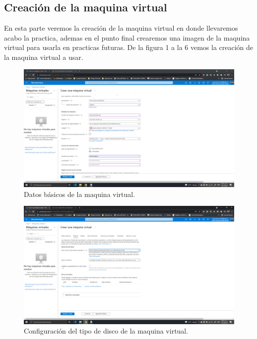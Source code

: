 \documentclass[11pt]{article}
\begin{document}
			\subsection{Creación de la maquina virtual}
En esta parte veremos la creación de la maquina virtual en donde llevaremos acabo la practica, ademas en el punto final crearemos una imagen de la maquina virtual para usarla en practicas futuras. De la figura 1 a la 6 vemos la creación de la maquina virtual a usar.
		\begin{figure}[H]
			\centering
			\includegraphics[scale=0.34]{resources/Infobasica.png}
			\caption{Datos básicos de la maquina virtual.}\label{fig:picture}
		\end{figure}
		\begin{figure}[H]
			\centering
			\includegraphics[scale=0.34]{resources/disco.png}
			\caption{Configuración del tipo de disco de la maquina virtual.}\label{fig:picture}
		\end{figure}
\end{document}

